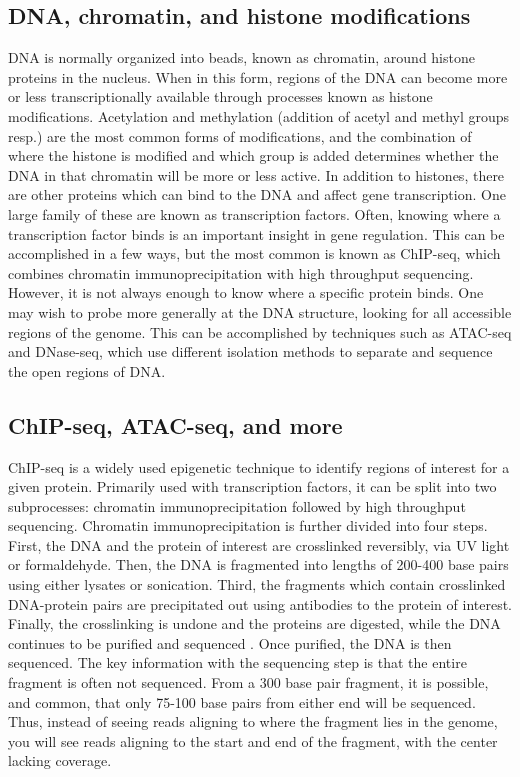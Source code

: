 \documentclass[a4paper]{article}
\begin{document}
    \subsection{DNA, chromatin, and histone modifications}
    DNA is normally organized into beads, known as chromatin, around histone proteins in the nucleus. When in this form,
    regions of the DNA can become more or less transcriptionally available through processes known as histone modifications.
    Acetylation and methylation (addition of acetyl and methyl groups resp.) are the most common forms of modifications, and
    the combination of where the histone is modified and which group is added determines whether the DNA in that chromatin
    will be more or less active. In addition to histones, there are other proteins which can bind to the DNA and affect
    gene transcription. One large family of these are known as transcription factors. Often, knowing where a transcription
    factor binds is an important insight in gene regulation. This can be accomplished in a few ways, but the most common
    is known as ChIP-seq, which combines chromatin immunoprecipitation with high throughput sequencing.
    However, it is not always enough to know where a specific protein binds. One may wish to probe
    more generally at the DNA structure, looking for all accessible regions of the genome. This can be accomplished by
    techniques such as ATAC-seq and DNase-seq, which use different isolation methods to separate and sequence the open regions of DNA.

    \subsection{ChIP-seq, ATAC-seq, and more}
    ChIP-seq \cite{johnson_genome-wide_2007} is a widely used epigenetic technique to identify regions of interest for a given protein. Primarily used
    with transcription factors, it can be split into two subprocesses: chromatin immunoprecipitation followed by high
    throughput sequencing. Chromatin immunoprecipitation is further divided into four steps. First, the DNA and the protein
    of interest are crosslinked reversibly, via UV light or formaldehyde. Then, the DNA is fragmented into lengths of 200-400
    base pairs using either lysates or sonication. Third, the fragments which contain crosslinked DNA-protein pairs are
    precipitated out using antibodies to the protein of interest. Finally, the crosslinking is undone and the proteins
    are digested, while the DNA continues to be purified and sequenced \cite{collas_current_2010}. Once purified, the DNA is then sequenced.
    The key information with the sequencing step is that the entire fragment is often not sequenced. From a 300 base pair
    fragment, it is possible, and common, that only 75-100 base pairs from either end will be sequenced. Thus, instead
    of seeing reads aligning to where the fragment lies in the genome, you will see reads aligning to the start and end
    of the fragment, with the center lacking coverage.
\end{document}
